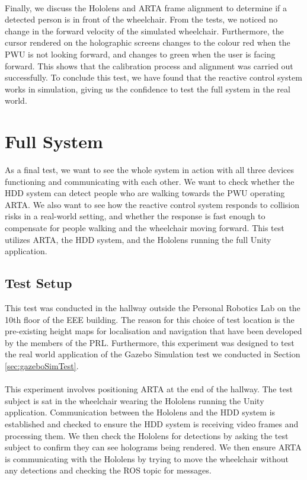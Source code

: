 \paragraph{}Finally, we discuss the Hololens and ARTA frame alignment to determine if a detected person is in front of the wheelchair. From the tests, we noticed no change in the forward velocity of the simulated wheelchair. Furthermore, the cursor rendered on the holographic screens changes to the colour red when the PWU is not looking forward, and changes to green when the user is facing forward. This shows that the calibration process and alignment was carried out successfully. To conclude this test, we have found that the reactive control system works in simulation, giving us the confidence to test the full system in the real world.


\newpage

\section{Full System}
As a final test, we want to see the whole system in action with all three devices functioning and communicating with each other. We want to check whether the HDD system can detect people who are walking towards the PWU operating ARTA. We also want to see how the reactive control system responds to collision risks in a real-world setting, and whether the response is fast enough to compensate for people walking and the wheelchair moving forward. This test utilizes ARTA, the HDD system, and the Hololens running the full Unity application.

\subsection{Test Setup}
This test was conducted in the hallway outside the Personal Robotics Lab on the 10th floor of the EEE building. The reason for this choice of test location is the pre-existing height maps for localisation and navigation that have been developed by the members of the PRL. Furthermore, this experiment was designed to test the real world application of the Gazebo Simulation test we conducted in Section \ref{sec:gazeboSimTest}.

\paragraph{} This experiment involves positioning ARTA at the end of the hallway. The test subject is sat in the wheelchair wearing the Hololens running the Unity application. Communication between the Hololens and the HDD system is established and checked to ensure the HDD system is receiving video frames and processing them. We then check the Hololens for detections by asking the test subject to confirm they can see holograms being rendered. We then ensure ARTA is communicating with the Hololens by trying to move the wheelchair without any detections and checking the  ROS topic for messages.

